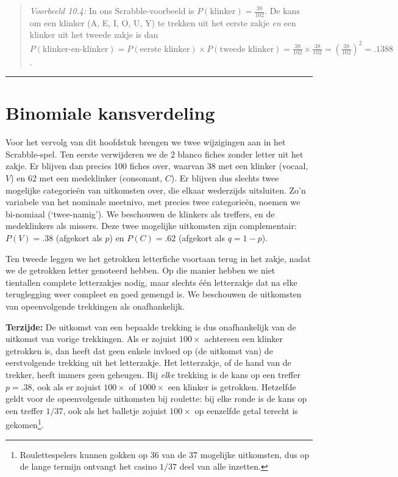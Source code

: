 \documentclass[
]{book}
\begin{document}
\begin{quote}
\emph{Voorbeeld 10.4:}
In ons Scrabble-voorbeeld is \(P(\textrm{klinker})=\frac{38}{102}\). De kans
om een klinker (A, E, I, O, U, Y) te trekken uit het eerste zakje \emph{en}
een klinker uit het tweede zakje is dan
\(P(\textrm{klinker-en-klinker})=P(\textrm{eerste klinker}) \times P(\textrm{tweede klinker})=\frac{38}{102} \times \frac{38}{102} = (\frac{38}{102})^2 = .1388\).
\end{quote}

\begin{center}\rule{0.5\linewidth}{0.5pt}\end{center}

\section{Binomiale kansverdeling}\label{sec:binomiaalverdeling}

Voor het vervolg van dit hoofdstuk brengen we twee wijzigingen aan in
het Scrabble-spel. Ten eerste verwijderen we de 2 blanco fiches zonder
letter uit het zakje. Er blijven dan precies 100 fiches over, waarvan 38
met een klinker (vocaal, \(V\)) en 62 met een medeklinker (consonant,
\(C\)). Er blijven dus slechts twee mogelijke categorieën van uitkomsten
over, die elkaar wederzijds uitsluiten. Zo'n variabele van het nominale
meetnivo, met precies twee categorieën, noemen we bi-nomiaal
(`twee-namig'). We beschouwen de klinkers als treffers, en de
medeklinkers als missers. Deze twee mogelijke uitkomsten zijn
complementair: \(P(V)=.38\) (afgekort als \(p\)) en \(P(C)=.62\) (afgekort als
\(q=1-p\)).

Ten tweede leggen we het getrokken letterfiche voortaan terug in het
zakje, nadat we de getrokken letter genoteerd hebben. Op die manier
hebben we niet tientallen complete letterzakjes nodig, maar slechts één
letterzakje dat na elke teruglegging weer compleet en goed gemengd is.
We beschouwen de uitkomsten van opeenvolgende trekkingen als
onafhankelijk.

\textbf{Terzijde:} De uitkomst van een bepaalde trekking is dus onafhankelijk
van de uitkomst van vorige trekkingen. Als er zojuist \(100\times\)
achtereen een klinker getrokken is, dan heeft dat geen enkele invloed op
(de uitkomst van) de eerstvolgende trekking uit het letterzakje. Het
letterzakje, of de hand van de trekker, heeft immers geen geheugen. Bij
\emph{elke} trekking is de kans op een treffer \(p=.38\), ook als er zojuist
\(100\times\) of \(1000\times\) een klinker is getrokken. Hetzelfde geldt
voor de opeenvolgende uitkomsten bij roulette: bij elke ronde is de kans
op een treffer \(1/37\), ook als het balletje zojuist \(100\times\) op
eenzelfde getal terecht is gekomen\footnote{Roulettespelers kunnen gokken op 36 van de 37 mogelijke uitkomsten, dus op de lange termijn ontvangt het casino \(1/37\) deel van alle inzetten.}.
\end{document}
